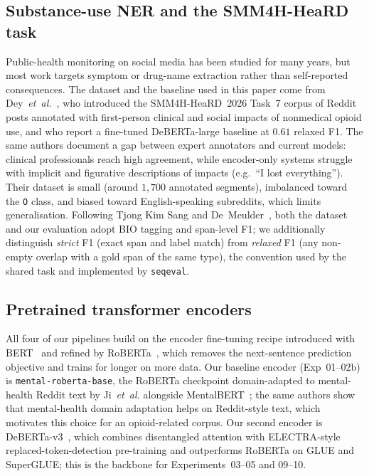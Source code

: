 \documentclass[journal]{IEEEtran}
\begin{document}
\subsection{Substance-use NER and the SMM4H-HeaRD task}
Public-health monitoring on social media has been studied for many
years, but most work targets symptom or drug-name extraction rather
than self-reported consequences. The dataset and the baseline used in
this paper come from Dey~\emph{et~al.}~\cite{dey2025inference}, who
introduced the SMM4H-HeaRD~2026 Task~7 corpus of Reddit posts
annotated with first-person clinical and social impacts of nonmedical
opioid use, and who report a fine-tuned DeBERTa-large baseline at
$0.61$ relaxed F1. The same authors document a gap between expert
annotators and current models: clinical professionals reach high
agreement, while encoder-only systems struggle with implicit and
figurative descriptions of impacts (e.g.~``I lost everything''). Their
dataset is small (around $1{,}700$ annotated segments), imbalanced
toward the \texttt{O} class, and biased toward English-speaking
subreddits, which limits generalisation. Following Tjong Kim Sang and
De~Meulder~\cite{tjong2003conll}, both the dataset and our evaluation
adopt BIO tagging and span-level F1; we additionally distinguish
\emph{strict} F1 (exact span and label match) from \emph{relaxed} F1
(any non-empty overlap with a gold span of the same type), the
convention used by the shared task and implemented by
\texttt{seqeval}.

\subsection{Pretrained transformer encoders}
All four of our pipelines build on the encoder fine-tuning recipe
introduced with BERT~\cite{devlin2019bert} and refined by
RoBERTa~\cite{liu2019roberta}, which removes the next-sentence
prediction objective and trains for longer on more data. Our baseline
encoder (Exp~01--02b) is \texttt{mental-roberta-base}, the RoBERTa
checkpoint domain-adapted to mental-health Reddit text by
Ji~\emph{et~al.} alongside MentalBERT~\cite{ji2022mentalbert}; the
same authors show that mental-health domain adaptation helps on
Reddit-style text, which motivates this choice for an opioid-related
corpus. Our second encoder is DeBERTa-v3~\cite{he2023debertav3},
which combines disentangled attention with ELECTRA-style
replaced-token-detection pre-training and outperforms RoBERTa on GLUE
and SuperGLUE; this is the backbone for Experiments~03--05 and
09--10.
\end{document}
